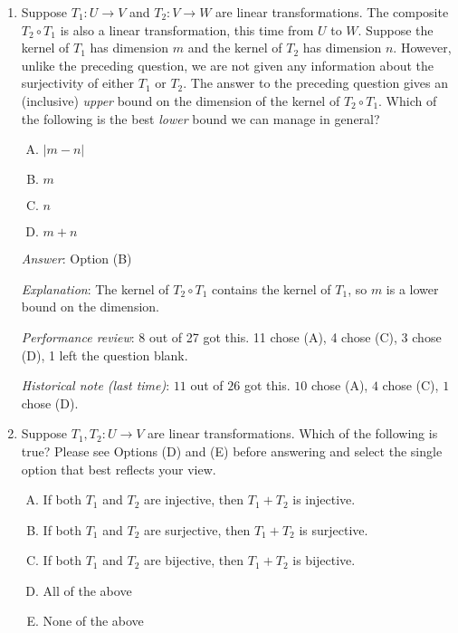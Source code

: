 \documentclass[10pt]{amsart}
\begin{document}
\begin{enumerate}
  {\em Answer}: Option (C)

  {\em Explanation}: See the lecture notes for more.

  {\em Performance review}: 12 out of 27 got this. 5 chose (D), 4
  chose (A), 3 chose (B), 2 chose (E), 1 left the question blank.

  {\em Historical note (last time)}: $3$ out of $26$ got this. $13$ chose (B),
  $7$ chose (A), $3$ chose (D).

\item Suppose $T_1: U \to V$ and $T_2:V \to W$ are linear
  transformations. The composite $T_2 \circ T_1$ is also a linear
  transformation, this time from $U$ to $W$. Suppose the kernel of
  $T_1$ has dimension $m$ and the kernel of $T_2$ has dimension
  $n$. However, unlike the preceding question, we are not given any
  information about the surjectivity of either $T_1$ or $T_2$. The
  answer to the preceding question gives an (inclusive) {\em upper}
  bound on the dimension of the kernel of $T_2 \circ T_1$. Which of
  the following is the best {\em lower} bound we can manage in
  general?

  \begin{enumerate}[(A)]
  \item $|m - n|$
  \item $m$
  \item $n$
  \item $m + n$
  \end{enumerate}

  {\em Answer}: Option (B)

  {\em Explanation}: The kernel of $T_2 \circ T_1$ contains the kernel
  of $T_1$, so $m$ is a lower bound on the dimension.

  {\em Performance review}: 8 out of 27 got this. 11 chose (A), 4
  chose (C), 3 chose (D), 1 left the question blank.

  {\em Historical note (last time)}: $11$ out of $26$ got this. $10$ chose (A),
  $4$ chose (C), $1$ chose (D).

\item Suppose $T_1,T_2:U \to V$ are linear transformations. Which of
  the following is true? Please see Options (D) and (E) before
  answering and select the single option that best reflects your view.

  \begin{enumerate}[(A)]
  \item If both $T_1$ and $T_2$ are injective, then $T_1 + T_2$ is injective.
  \item If both $T_1$ and $T_2$ are surjective, then $T_1 + T_2$ is surjective.
  \item If both $T_1$ and $T_2$ are bijective, then $T_1 + T_2$ is bijective.
  \item All of the above
  \item None of the above
  \end{enumerate}


\end{enumerate}
\end{document}

